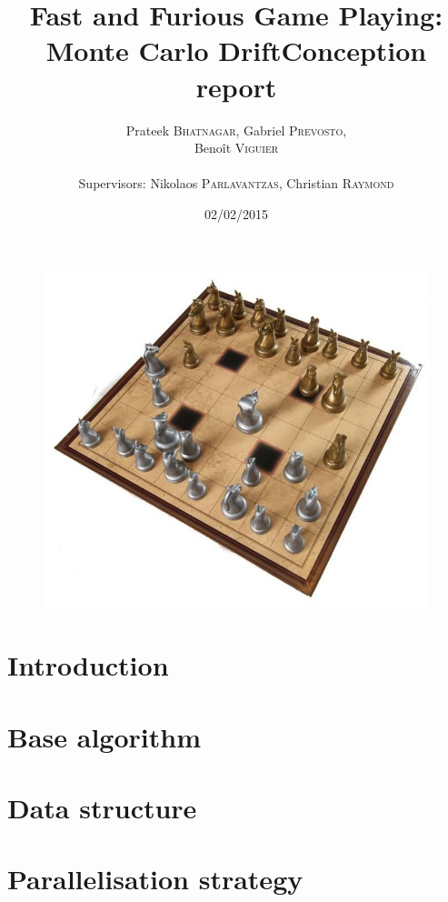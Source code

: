 \documentclass[12pt]{article}
\title{Fast and Furious Game Playing: Monte Carlo Drift\smallbreak Conception report} %
\author{Prateek \textsc{Bhatnagar}, Gabriel \textsc{Prevosto}, \\
        Benoît \textsc{Viguier} \\
        \\
        Supervisors: Nikolaos \textsc{Parlavantzas}, Christian \textsc{Raymond}}
\date{02/02/2015}
\begin{document}
\maketitle

\begin{figure}[!h] 
\centerline{\includegraphics[scale=0.50]{Pictures/arimaa}}
\end{figure}
\newpage

\tableofcontents
\newpage


\section{Introduction}				\label{sec:introduction} 		

\newpage
\section{Base algorithm}			\label{sec:Algo}			

\newpage
\section{Data structure}			\label{sec:data}			

\newpage
\section{Parallelisation strategy}		\label{sec:paralstrat}			
\end{document}
